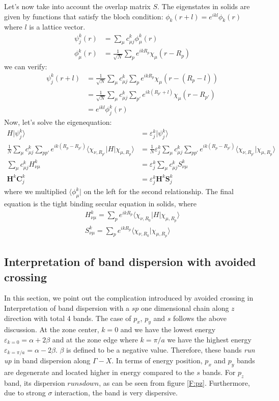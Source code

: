 \documentclass{article}
\newcommand{\statebra}[1]{\langle #1 |}
\newcommand{\stateket}[1]{| #1 \rangle}
\begin{document}
Let's now take into account the overlap matrix $S$. The eigenstates in solids are given 
by functions that satisfy the bloch condition: $\phi_k(r+l) = e^{ikl} \phi_k(r)$ where $l$ 
is a lattice vector. 
\begin{align}
    \psi_j^k(r) &= \sum_{\mu}c^k_{\mu j}\phi_{\mu}^k(r) \\ 
    \phi_{\mu}^k(r) &= \frac{1}{\sqrt{N}} \sum_p e^{ikR_p} \chi_{\mu}(r - R_p)
\end{align}
we can verify:
\begin{align}
    \psi_j^k(r+l) &= \frac{1}{\sqrt{N}} \sum_{\mu} c^k_{\mu j} \sum_p e^{ikR_p} \chi_{\mu}(r - (R_p - l)) \\ 
    &= \frac{1}{\sqrt{N}} \sum_{\mu} c^k_{\mu j} \sum_{p'} e^{ik(R_{p'}+l)} \chi_{\mu}(r - R_{p'}) \\ 
    &= e^{ikl} \phi_j^k(r)
\end{align}
Now, let's solve the eigenequation:
\begin{align}
    H \stateket{ \psi_j^k } &= \varepsilon_j^k \stateket{ \psi_j^k } \\ 
    \frac{1}{N} \sum_{\mu} c^k_{\mu j} \sum_{pp'} e^{ik(R_p - R_{p'})} \statebra{\chi_{\nu,R_{p'}}} H \stateket{\chi_{\mu,R_p}}
    &= \frac{1}{N}  \varepsilon_j^k \sum_{\mu} c^k_{\mu j} \sum_{pp'} e^{ik(R_p - R_{p'})} \statebra{\chi_{\nu,R_{p'}}} \chi_{\mu,R_p} \rangle \\ 
    \sum_{\mu} c^k_{\mu j} H_{\nu\mu}^k &= \varepsilon_j^k \sum_{\mu} c^k_{\mu j} S_{\nu\mu}^k \\ 
    \mathbf{H}^k \mathbf{C}_{j}^k &= \varepsilon_j^k \mathbf{H}^k \mathbf{S}_{j}^k
\end{align}
where we multiplied $\statebra{\phi_{\mu}^k}$ on the left for the second relationship. The final equation 
is the tight binding secular equation in solids, where 
\begin{align}
    H_{\nu\mu}^k = \sum_p e^{ikR_p} \statebra{\chi_{\nu,R_0}} H \stateket{\chi_{\mu,R_p}} \\ 
    S_{\nu\mu}^k = \sum_p e^{ikR_p} \statebra{\chi_{\nu,R_0}} \chi_{\mu,R_p} \rangle
\end{align}

\subsection{Interpretation of band dispersion with avoided crossing}
In this section, we point out the complication introduced by avoided crossing in 
Interpretation of band dispersion with a $sp$ one dimensional chain along $z$ direction 
with total 4 bands.
The case of $p_x$, $p_y$ and $s$ follows the above discussion. At the zone center, $k=0$ and we 
have the lowest energy $\varepsilon_{k=0} = \alpha + 2\beta$ and at the zone edge where $k = \pi/a$ 
we have the highest energy $\varepsilon_{k=\pi/a} = \alpha - 2\beta$. $\beta$ is defined to be a 
negative value. Therefore, these bands \emph{run up} in band dispersion along $\Gamma-X$. 
In terms of energy position, $p_x$ and $p_y$ bands are degenerate and located higher 
in energy compared to the $s$ bands. For $p_z$ band, its dispersion $runs down$, as can be 
seen from figure \ref{F:pz}. Furthermore, due to strong $\sigma$ interaction, the band is very dispersive. 
\end{document}
